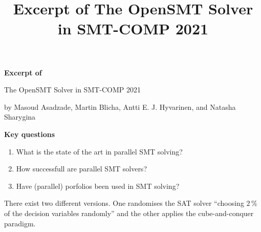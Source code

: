 \documentclass{scrartcl}
\title{Excerpt of The OpenSMT Solver in SMT-COMP 2021}
\begin{document}
\begin{center}
    \Large{\textbf{Excerpt of}}

    \LARGE{The OpenSMT Solver in SMT-COMP 2021}

    \large{by Masoud Asadzade, Martin Blicha, Antti E. J. Hyvarinen, and Natasha Sharygina}
\end{center}

\vspace{1cm}

\begin{addmargin}[0.2\linewidth]{0.2\linewidth}
    \begin{center}
        \textbf{Key questions}
    \end{center}
    \begin{enumerate}[i]
        \item What is the state of the art in parallel SMT solving?
        \item How successfull are parallel SMT solvers?
        \item Have (parallel) porfolios been used in SMT solving?
    \end{enumerate}
\end{addmargin}

\vspace{1cm}

There exist two different versions.
One randomises the SAT solver \enquote{choosing \(2\, \%\) of the decision variables randomly}
and the other applies the cube-and-conquer paradigm.
\end{document}
